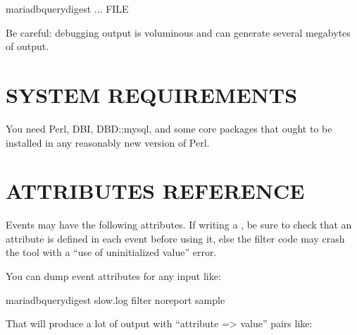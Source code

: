 \documentclass[letterpaper,10pt,english]{sphinxmanual}
\begin{document}
\begin{sphinxVerbatim}[commandchars=\\\{\}]
 mariadb\PYGZhy{}query\PYGZhy{}digest ... \PYGZgt{} FILE \PYGZgt{}
\end{sphinxVerbatim}

Be careful: debugging output is voluminous and can generate several megabytes
of output.


\section{SYSTEM REQUIREMENTS}
\label{\detokenize{mariadb-query-digest:system-requirements}}
You need Perl, DBI, DBD::mysql, and some core packages that ought to be
installed in any reasonably new version of Perl.


\section{ATTRIBUTES REFERENCE}
\label{\detokenize{mariadb-query-digest:attributes-reference}}
Events may have the following attributes.  If writing a {\hyperref[\detokenize{mariadb-query-digest:cmdoption-mariadb-query-digest-filter}]{}},
be sure to check that an attribute is defined in each event before
using it, else the filter code may crash the tool with a
“use of uninitialized value” error.

You can dump event attributes for any input like:

\begin{sphinxVerbatim}[commandchars=\\\{\}]
\PYGZdl{} mariadb\PYGZhy{}query\PYGZhy{}digest                  
    slow.log                       
    \PYGZhy{}\PYGZhy{}filter  
    \PYGZhy{}\PYGZhy{}no\PYGZhy{}report                    
    \PYGZhy{}\PYGZhy{}sample 
\end{sphinxVerbatim}

That will produce a lot of output with “attribute =\textgreater{} value” pairs like:
\end{document}
